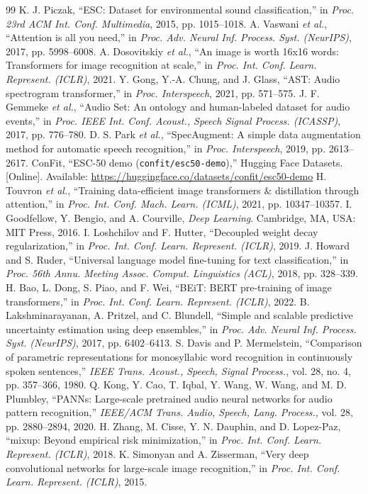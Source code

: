 \documentclass[letterpaper, 10 pt, conference]{ieeeconf}
\begin{document}
\begin{thebibliography}{99}
\small
{} K. J. Piczak, ``ESC: Dataset for environmental sound classification,'' in \textit{Proc. 23rd ACM Int. Conf. Multimedia}, 2015, pp. 1015--1018.
 A. Vaswani \textit{et al.}, ``Attention is all you need,'' in \textit{Proc. Adv. Neural Inf. Process. Syst. (NeurIPS)}, 2017, pp. 5998--6008.
 A. Dosovitskiy \textit{et al.}, ``An image is worth 16x16 words: Transformers for image recognition at scale,'' in \textit{Proc. Int. Conf. Learn. Represent. (ICLR)}, 2021.
 Y. Gong, Y.-A. Chung, and J. Glass, ``AST: Audio spectrogram transformer,'' in \textit{Proc. Interspeech}, 2021, pp. 571--575.
 J. F. Gemmeke \textit{et al.}, ``Audio Set: An ontology and human-labeled dataset for audio events,'' in \textit{Proc. IEEE Int. Conf. Acoust., Speech Signal Process. (ICASSP)}, 2017, pp. 776--780.
 D. S. Park \textit{et al.}, ``SpecAugment: A simple data augmentation method for automatic speech recognition,'' in \textit{Proc. Interspeech}, 2019, pp. 2613--2617.
 ConFit, ``ESC-50 demo (\texttt{confit/esc50-demo}),'' Hugging Face Datasets. [Online]. Available: \url{https://huggingface.co/datasets/confit/esc50-demo}
 H. Touvron \textit{et al.}, ``Training data-efficient image transformers \& distillation through attention,'' in \textit{Proc. Int. Conf. Mach. Learn. (ICML)}, 2021, pp. 10347--10357.
 I. Goodfellow, Y. Bengio, and A. Courville, \textit{Deep Learning}. Cambridge, MA, USA: MIT Press, 2016.
 I. Loshchilov and F. Hutter, ``Decoupled weight decay regularization,'' in \textit{Proc. Int. Conf. Learn. Represent. (ICLR)}, 2019.
 J. Howard and S. Ruder, ``Universal language model fine-tuning for text classification,'' in \textit{Proc. 56th Annu. Meeting Assoc. Comput. Linguistics (ACL)}, 2018, pp. 328--339.
 H. Bao, L. Dong, S. Piao, and F. Wei, ``BEiT: BERT pre-training of image transformers,'' in \textit{Proc. Int. Conf. Learn. Represent. (ICLR)}, 2022.
 B. Lakshminarayanan, A. Pritzel, and C. Blundell, ``Simple and scalable predictive uncertainty estimation using deep ensembles,'' in \textit{Proc. Adv. Neural Inf. Process. Syst. (NeurIPS)}, 2017, pp. 6402--6413.
 S. Davis and P. Mermelstein, ``Comparison of parametric representations for monosyllabic word recognition in continuously spoken sentences,'' \textit{IEEE Trans. Acoust., Speech, Signal Process.}, vol. 28, no. 4, pp. 357--366, 1980.
 Q. Kong, Y. Cao, T. Iqbal, Y. Wang, W. Wang, and M. D. Plumbley, ``PANNs: Large-scale pretrained audio neural networks for audio pattern recognition,'' \textit{IEEE/ACM Trans. Audio, Speech, Lang. Process.}, vol. 28, pp. 2880--2894, 2020.
 H. Zhang, M. Cisse, Y. N. Dauphin, and D. Lopez-Paz, ``mixup: Beyond empirical risk minimization,'' in \textit{Proc. Int. Conf. Learn. Represent. (ICLR)}, 2018.
 K. Simonyan and A. Zisserman, ``Very deep convolutional networks for large-scale image recognition,'' in \textit{Proc. Int. Conf. Learn. Represent. (ICLR)}, 2015.
\end{thebibliography}
\end{document}
